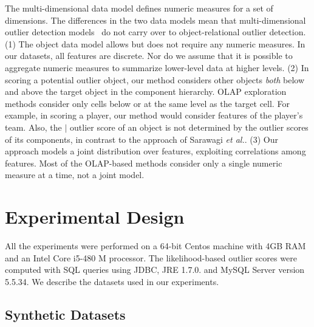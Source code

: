 \documentclass[conference]{IEEEtran}
\begin{document}
The multi-dimensional data model defines numeric measures for a set of dimensions. 
The differences in the two data models mean that multi-dimensional outlier detection models~\cite{Sarawagi1998} do not carry over to object-relational outlier detection. (1) The object data model allows but does not require any numeric measures. In our datasets, all features are discrete. Nor do we assume that it is possible to aggregate numeric measures to summarize lower-level data at higher levels.  
(2) In scoring a potential outlier object, our method considers other objects {\em both} below and above the target object in the component hierarchy. OLAP exploration methods consider only cells below or at the same level as the target cell. For example, in scoring a player, our method would consider features of the player's team.  
Also, the $\mid$ outlier score of an object is not determined by the outlier scores of its components, in contrast to the approach of Sarawagi {\em et al.}.
(3) Our approach models a joint distribution over features, exploiting correlations among features. Most of the OLAP-based methods consider only a single numeric measure at a time, not a joint model.  
								
					
				
				\section{Experimental Design}
All the experiments were performed on a 64-bit Centos machine with 4GB RAM and an Intel Core i5-480 M processor. The likelihood-based outlier scores were computed with SQL queries using JDBC, JRE 1.7.0. and MySQL Server version 5.5.34.
We describe the datasets used in our experiments.
				
				\subsection{Synthetic Datasets}
				
\end{document}

